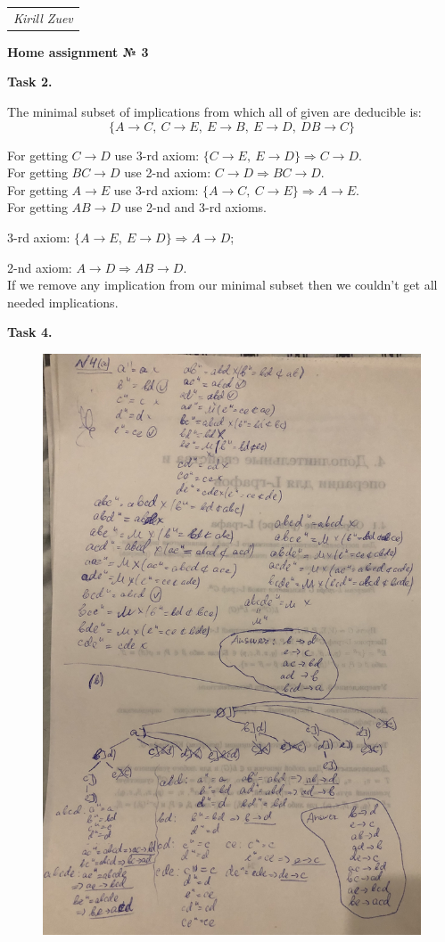 \documentclass{article}
\begin{document}
\null\hfill\begin{tabular}[t]{l@{}}
	\textit{Kirill Zuev}
\end{tabular}

\begin{center}
	\textbf{Home assignment № 3}
\end{center}

\textbf{Task 2.}

The minimal subset of implications from which all of given are deducible is:
$$
\{ A \to C,\ C \to E,\ E \to B,\ E \to D,\ DB \to C \}
$$

For getting $C \to D$ use 3-rd axiom: $\{ C \to E,\ E \to D \} \Rightarrow C \to D$.\\

For getting $BC \to D$ use 2-nd axiom: $C \to D \Rightarrow BC \to D$.\\

For getting $A \to E$ use 3-rd axiom: $\{ A \to C,\ C \to E \} \Rightarrow A \to E$.\\

For getting $AB \to D$ use 2-nd and 3-rd axioms.

3-rd axiom: $\{ A \to E,\ E \to D \} \Rightarrow A \to D$;

2-nd axiom: $A \to D \Rightarrow AB \to D$.\\

If we remove any implication from our minimal subset then we couldn't get all needed implications.
\clearpage

\textbf{Task 4.}

\begin{figure}[h!]
	\includegraphics[width=15cm]{4.jpg}
\end{figure}

 
\end{document}
